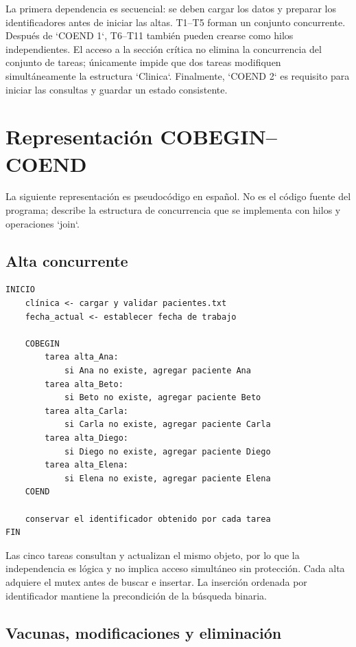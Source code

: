 \documentclass[12pt,letterpaper]{article}
\begin{document}
La primera dependencia es secuencial: se deben cargar los datos y preparar los
identificadores antes de iniciar las altas. T1--T5 forman un conjunto
concurrente. Después de `COEND 1`, T6--T11 también pueden crearse como hilos
independientes. El acceso a la sección crítica no elimina la concurrencia del
conjunto de tareas; únicamente impide que dos tareas modifiquen simultáneamente
la estructura `Clinica`. Finalmente, `COEND 2` es requisito para iniciar las
consultas y guardar un estado consistente.

\section{Representación COBEGIN--COEND}

La siguiente representación es pseudocódigo en español. No es el código fuente
del programa; describe la estructura de concurrencia que se implementa con
hilos y operaciones `join`.

\subsection{Alta concurrente}

\begin{lstlisting}[language={},caption={Pseudocódigo de altas concurrentes.},label={lst:altas}]
INICIO
    clínica <- cargar y validar pacientes.txt
    fecha_actual <- establecer fecha de trabajo

    COBEGIN
        tarea alta_Ana:
            si Ana no existe, agregar paciente Ana
        tarea alta_Beto:
            si Beto no existe, agregar paciente Beto
        tarea alta_Carla:
            si Carla no existe, agregar paciente Carla
        tarea alta_Diego:
            si Diego no existe, agregar paciente Diego
        tarea alta_Elena:
            si Elena no existe, agregar paciente Elena
    COEND

    conservar el identificador obtenido por cada tarea
FIN
\end{lstlisting}

Las cinco tareas consultan y actualizan el mismo objeto, por lo que la
independencia es lógica y no implica acceso simultáneo sin protección. Cada
alta adquiere el mutex antes de buscar e insertar. La inserción ordenada por
identificador mantiene la precondición de la búsqueda binaria.

\subsection{Vacunas, modificaciones y eliminación}
\end{document}
